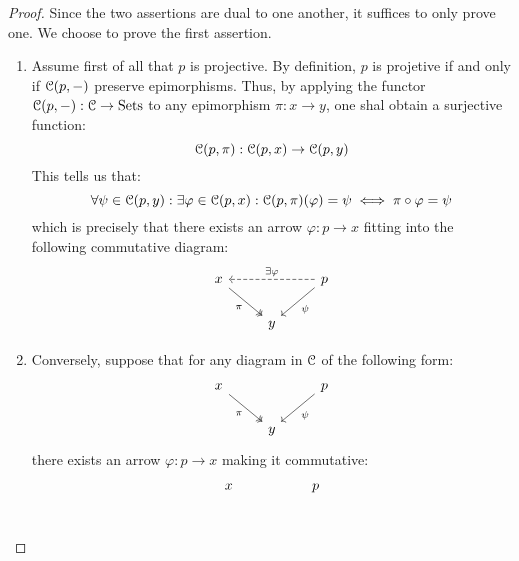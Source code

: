                 \begin{proof}
                    Since the two assertions are dual to one another, it suffices to only prove one. We choose to prove the first assertion.
                        \begin{enumerate}
                            \item Assume first of all that $p$ is projective. By definition, $p$ is projetive if and only if $\C(p, -)$ preserve epimorphisms. Thus, by applying the functor $\C(p, -): \C \to \Sets$ to any epimorphism $\pi: x \to y$, one shal obtain a surjective function:
                                $$\C(p, \pi): \C(p, x) \to \C(p, y)$$
                            This tells us that:
                                $$\forall \psi \in \C(p, y): \exists \varphi \in \C(p, x): \C(p, \pi)(\varphi) = \psi \iff \pi \circ \varphi = \psi$$
                            which is precisely that there exists an arrow $\varphi: p \to x$ fitting into the following commutative diagram:
                                $$
                                    \begin{tikzcd}
                                    	x && p \\
                                    	& y
                                    	\arrow["\pi"', two heads, from=1-1, to=2-2]
                                    	\arrow["\psi", from=1-3, to=2-2]
                                    	\arrow["{\exists \varphi}"', dashed, from=1-3, to=1-1]
                                    \end{tikzcd}
                                $$
                            \item Conversely, suppose that for any diagram in $\C$ of the following form:
                                $$
                                    \begin{tikzcd}
                                    	x && p \\
                                    	& y
                                    	\arrow["\pi"', two heads, from=1-1, to=2-2]
                                    	\arrow["\psi", from=1-3, to=2-2]
                                    \end{tikzcd}
                                $$
                            there exists an arrow $\varphi: p \to x$ making it commutative:
                                $$
                                    \begin{tikzcd}
                                    	x && p \\

\end{tikzcd}$$
\end{enumerate}
\end{proof}
